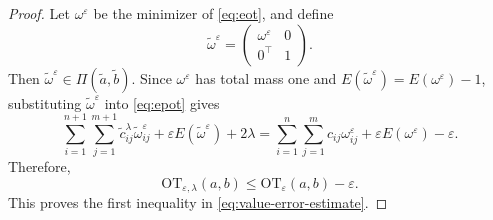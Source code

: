 \documentclass[10pt,a4paper]{amsart}
\newcommand{\OT}{\mathrm{OT}}
\newcommand{\eps}{\varepsilon}
\begin{document}
\begin{proof}
Let $\omega^\eps$ be the minimizer of \eqref{eq:eot}, and define
\begin{equation*}
  \widetilde\omega^\eps =
  \begin{pmatrix}
    \omega^\eps & 0\\
    0^\top & 1
  \end{pmatrix}.
\end{equation*}
Then $\widetilde\omega^\eps\in\Pi(\widetilde a,\widetilde b)$. Since $\omega^\eps$ has total mass one and $E(\widetilde\omega^\eps)=E(\omega^\eps)-1$, substituting $\widetilde\omega^\eps$ into \eqref{eq:epot} gives
\begin{equation*}
  \sum_{i = 1}^{n + 1}\sum_{j = 1}^{m + 1}\widetilde c^\lambda_{ij}\widetilde\omega^\eps_{ij} + \eps E(\widetilde\omega^\eps) + 2\lambda = \sum_{i = 1}^{n}\sum_{j = 1}^{m}c_{ij}\omega^\eps_{ij} + \eps E(\omega^\eps)-\eps.
\end{equation*}
Therefore,
\begin{equation}\label{eq:epot-upper-balanced}
  \OT_{\eps,\lambda}(a,b) \leq \OT_{\eps}(a,b)-\eps.
\end{equation}
This proves the first inequality in \eqref{eq:value-error-estimate}.


\end{proof}
\end{document}
